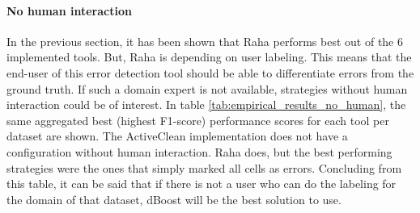 \paragraph{No human interaction} In the previous section, it has been shown that Raha performs best out of the 6 implemented tools. But, Raha is depending on user labeling. This means that the end-user of this error detection tool should be able to differentiate errors from the ground truth. If such a domain expert is not available, strategies without human interaction could be of interest. In table \ref{tab:empirical_results_no_human}, the same aggregated best (highest F1-score) performance scores for each tool per dataset are shown. The ActiveClean implementation does not have a configuration without human interaction. Raha does, but the best performing strategies were the ones that simply marked all cells as errors. Concluding from this table, it can be said that if there is not a user who can do the labeling for the domain of that dataset, dBoost will be the best solution to use.

